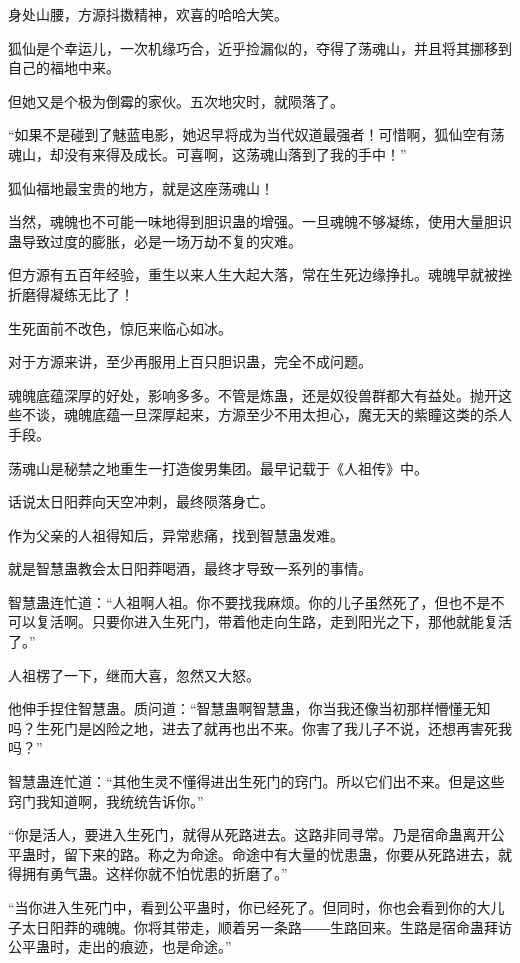 \begin{this_body}
身处山腰，方源抖擞精神，欢喜的哈哈大笑。

狐仙是个幸运儿，一次机缘巧合，近乎捡漏似的，夺得了荡魂山，并且将其挪移到自己的福地中来。

但她又是个极为倒霉的家伙。五次地灾时，就陨落了。

“如果不是碰到了魅蓝电影，她迟早将成为当代奴道最强者！可惜啊，狐仙空有荡魂山，却没有来得及成长。可喜啊，这荡魂山落到了我的手中！”

狐仙福地最宝贵的地方，就是这座荡魂山！

当然，魂魄也不可能一味地得到胆识蛊的增强。一旦魂魄不够凝练，使用大量胆识蛊导致过度的膨胀，必是一场万劫不复的灾难。

但方源有五百年经验，重生以来人生大起大落，常在生死边缘挣扎。魂魄早就被挫折磨得凝练无比了！

生死面前不改色，惊厄来临心如冰。

对于方源来讲，至少再服用上百只胆识蛊，完全不成问题。

魂魄底蕴深厚的好处，影响多多。不管是炼蛊，还是奴役兽群都大有益处。抛开这些不谈，魂魄底蕴一旦深厚起来，方源至少不用太担心，魔无天的紫瞳这类的杀人手段。

荡魂山是秘禁之地重生一打造俊男集团。最早记载于《人祖传》中。

话说太日阳莽向天空冲刺，最终陨落身亡。

作为父亲的人祖得知后，异常悲痛，找到智慧蛊发难。

就是智慧蛊教会太日阳莽喝酒，最终才导致一系列的事情。

智慧蛊连忙道：“人祖啊人祖。你不要找我麻烦。你的儿子虽然死了，但也不是不可以复活啊。只要你进入生死门，带着他走向生路，走到阳光之下，那他就能复活了。”

人祖楞了一下，继而大喜，忽然又大怒。

他伸手捏住智慧蛊。质问道：“智慧蛊啊智慧蛊，你当我还像当初那样懵懂无知吗？生死门是凶险之地，进去了就再也出不来。你害了我儿子不说，还想再害死我吗？”

智慧蛊连忙道：“其他生灵不懂得进出生死门的窍门。所以它们出不来。但是这些窍门我知道啊，我统统告诉你。”

“你是活人，要进入生死门，就得从死路进去。这路非同寻常。乃是宿命蛊离开公平蛊时，留下来的路。称之为命途。命途中有大量的忧患蛊，你要从死路进去，就得拥有勇气蛊。这样你就不怕忧患的折磨了。”

“当你进入生死门中，看到公平蛊时，你已经死了。但同时，你也会看到你的大儿子太日阳莽的魂魄。你将其带走，顺着另一条路――生路回来。生路是宿命蛊拜访公平蛊时，走出的痕迹，也是命途。”


\end{this_body}
